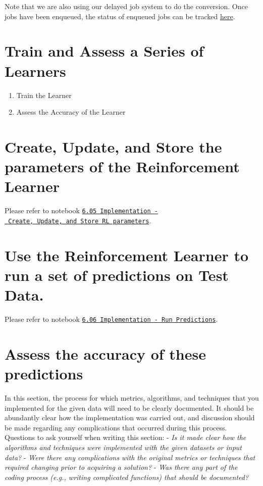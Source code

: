 \documentclass[]{report}
\begin{document}
Note that we are also using our delayed job system to do the conversion.
Once jobs have been enqueued, the status of enqueued jobs can be tracked
\href{http://joshuacook.me:8002/rq/default}{here}.

\chapter{Train and Assess a Series of
Learners}\label{train-and-assess-a-series-of-learners}

\begin{enumerate}
\def\labelenumi{\arabic{enumi}.}
\tightlist
\item
  Train the Learner
\item
  Assess the Accuracy of the Learner
\end{enumerate}

\chapter{Create, Update, and Store the parameters of the Reinforcement
Learner}\label{create-update-and-store-the-parameters-of-the-reinforcement-learner}

Please refer to notebook
\href{http://joshuacook.me:8003/notebooks/ipynb/6.05\%20Create,\%20Update,\%20and\%20Store\%20RL\%20parameters.ipynb}{\texttt{6.05\ Implementation\ -\ Create,\ Update,\ and\ Store\ RL\ parameters}}.

\chapter{Use the Reinforcement Learner to run a set of predictions on
Test
Data.}\label{use-the-reinforcement-learner-to-run-a-set-of-predictions-on-test-data.}

Please refer to notebook
\href{http://joshuacook.me:8003/notebooks/ipynb/6.06\%20Implementation\%20-\%20Run\%20Predictions.ipynb}{\texttt{6.06\ Implementation\ -\ Run\ Predictions}}.

\chapter{Assess the accuracy of these
predictions}\label{assess-the-accuracy-of-these-predictions}

In this section, the process for which metrics, algorithms, and
techniques that you implemented for the given data will need to be
clearly documented. It should be abundantly clear how the implementation
was carried out, and discussion should be made regarding any
complications that occurred during this process. Questions to ask
yourself when writing this section: - \emph{Is it made clear how the
algorithms and techniques were implemented with the given datasets or
input data?} - \emph{Were there any complications with the original
metrics or techniques that required changing prior to acquiring a
solution?} - \emph{Was there any part of the coding process (e.g.,
writing complicated functions) that should be documented?}
\end{document}
